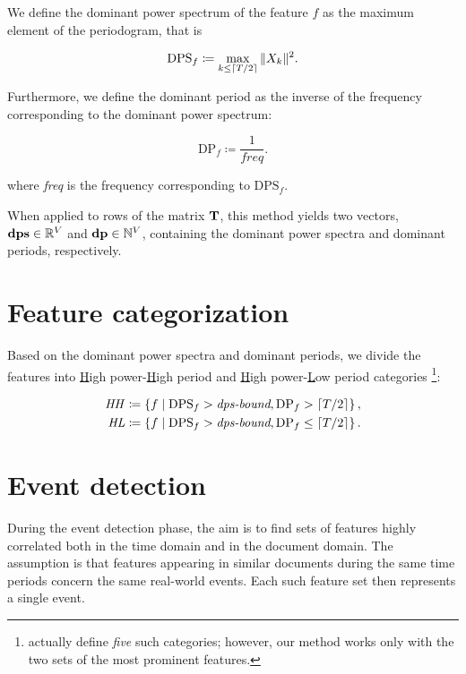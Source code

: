 We define the dominant power spectrum of the feature $f$ as the maximum element of the periodogram, that is

\begin{equation}
	\text{DPS}_{f} \coloneqq \max_{k \leq \lceil T / 2\rceil}{\|X_{k}\|^{2}}.
\end{equation}

Furthermore, we define the dominant period as the inverse of the frequency corresponding to the dominant power spectrum:

\begin{equation}
	\text{DP}_{f} \coloneqq \frac{1}{\mathit{freq}}.
\end{equation}

where \textit{freq} is the frequency corresponding to $\text{DPS}_{f}$.

When applied to rows of the matrix $\mathbf{T}$, this method yields two vectors, $\vect{DPS} \in \R^{\featcount}$ and $\vect{DP} \in \N^{\featcount}$, containing the dominant power spectra and dominant periods, respectively.


\section{Feature categorization}
Based on the dominant power spectra and dominant periods, we divide the features into \underline{H}igh power-\underline{H}igh period and \underline{H}igh power-\underline{L}ow period categories \footnote{\cite{event-detection} actually define \textit{five} such categories; however, our method works only with the two sets of the most prominent features.}:

\begin{equation}
\begin{split}
	\mathit{HH} \coloneqq \left\{ f \mid \text{DPS}_{f} > \textit{dps-bound}, \text{DP}_{f} > \lceil T / 2\rceil \right\}, \\
	\mathit{HL} \coloneqq \left\{ f \mid \text{DPS}_{f} > \textit{dps-bound}, \text{DP}_{f} \leq \lceil T / 2\rceil \right\}.
\end{split}
\end{equation}


\section{Event detection}

During the event detection phase, the aim is to find sets of features highly correlated both in the time domain and in the document domain. The assumption is that features appearing in similar documents during the same time periods concern the same real-world events. Each such feature set then represents a single event.

